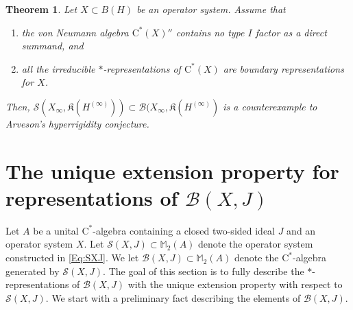\documentclass[10pt]{amsart}
\newcommand{\bM}{{\mathbb{M}}}
\newcommand{\B}{{\mathcal{B}}}
\renewcommand{\S}{{\mathcal{S}}}
\newcommand{\fK}{{\mathfrak{K}}}
\newcommand{\rC}{\mathrm{C}}
\newtheorem{theoremx}{Theorem}
\theoremstyle{definition}
\begin{document}
\begin{theoremx}\label{T:B}
Let $X\subset B(H)$ be an operator system. Assume that 
\begin{enumerate}[{\rm (i)}]
\item the von Neumann algebra $\rC^*(X)''$ contains no type $I$ factor as a direct summand, and
\item all the irreducible $*$-representations of $\rC^*(X)$ are boundary representations for $X$.
\end{enumerate}
Then, $\S(X_\infty,\fK(H^{(\infty)}))\subset \B(X_\infty,\fK(H^{(\infty)})$ is a counterexample to Arveson's hyperrigidity conjecture.
\end{theoremx}

\section{The unique extension property for representations of $\B(X,J)$}\label{S:uep}


Let $A$ be a unital $\rC^*$-algebra containing a closed two-sided ideal $J$ and an operator system $X$. Let $\S(X,J)\subset \bM_2(A)$ denote the operator system constructed in \eqref{Eq:SXJ}. We let $\B(X,J)\subset \bM_2(A)$ denote the $\rC^*$-algebra generated by $\S(X,J)$.  The goal of this section is to fully describe the $*$-representations of $\B(X,J)$ with the unique extension property with respect to $\S(X,J)$. We start with a preliminary fact describing the elements of $\B(X,J)$.
\end{document}
